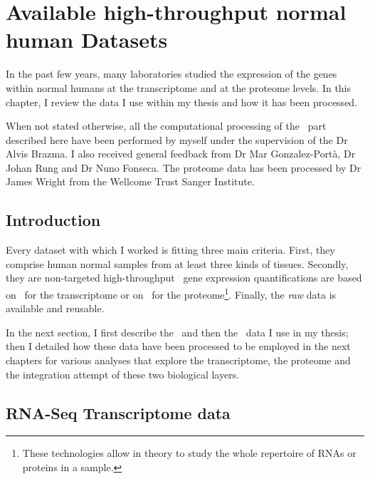 \chapter{Available high-throughput normal human Datasets}
\label{ch:datasets}

\begin{comment}
\setlength{\epigraphwidth}{0.57\textwidth}
\setlength{\epigraphrule}{0.1pt}
\epigraph{Data! Data! Data! I can’t make bricks without clay!}{Sherlock Homes
    (Sir Arthur Conan Doyle)}
\end{comment}

In the past few years, many laboratories studied the expression
of the genes within normal humans at the transcriptome and at
the proteome levels. In this chapter, I review the data I use within my thesis
and how it has been processed.

When not stated otherwise, all the computational processing of the \Rnaseq\ part
described here have been performed by myself under the supervision of
the Dr Alvis Brazma. I also received general feedback from Dr Mar Gonzalez-Portà,
Dr Johan Rung and Dr Nuno Fonseca. The proteome data has been processed by
Dr James Wright from the Wellcome Trust Sanger Institute.


\section{Introduction}

Every dataset with which I worked is fitting three main criteria.
First, they comprise human normal samples from at least three kinds of tissues.
Secondly, they are non-targeted high-throughput \ie\ gene expression
quantifications are based on \Rnaseq\ for the transcriptome or on \ms\ for the
proteome\footnote{These technologies allow in theory to study the whole
repertoire of \glspl{RNA} or proteins in a sample.}.
Finally, the \emph{raw} data is available and reusable.

In the next section, I first describe the \Rnaseq\ and then the \ms\ data I use
in my thesis; then I detailed how these data have been processed to be
employed in the next chapters for various analyses that explore the transcriptome,
the proteome and the integration attempt of these two biological layers.


\section{RNA-Seq Transcriptome data}
\label{sec:rnaseq-data}

